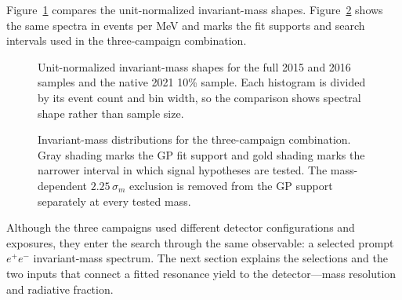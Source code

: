 Figure~\ref{fig:dataset-mass-shape-overlay} compares the unit-normalized invariant-mass
shapes. Figure~\ref{fig:dataset-mass-distributions-log} shows the same spectra in
events per MeV and marks the fit supports and search intervals used in the
three-campaign combination.

\begin{figure}[H]
\centering
{}
\caption{Unit-normalized invariant-mass shapes for the full 2015 and 2016 samples
and the native 2021 10\% sample. Each histogram is divided by its event count and bin
width, so the comparison shows spectral shape rather than sample size.}
\label{fig:dataset-mass-shape-overlay}
\end{figure}

\begin{figure}[H]
\centering
{}
\caption{Invariant-mass distributions for the three-campaign combination. Gray shading
marks the GP fit support and gold shading
marks the narrower interval in which signal hypotheses are tested. The mass-dependent
$2.25\,\sigma_m$ exclusion is removed from the GP support separately at every tested
mass.}
\label{fig:dataset-mass-distributions-log}
\end{figure}

Although the three campaigns used different detector configurations and exposures,
they enter the search through the same observable: a selected prompt $e^+e^-$
invariant-mass spectrum. The next section explains the selections and the two inputs
that connect a fitted resonance yield to the detector---mass resolution and radiative
fraction.
